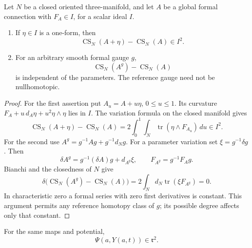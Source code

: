 \begin{lemma}
\label{conn:closed-comparisons}
Let \(N\) be a closed oriented three-manifold, and let \(A\)
be a global formal connection with \(F_A\in I\), for a
scalar ideal \(I\).
\begin{enumerate}
\item If \(\eta\in I\) is a one-form, then
\[
 \operatorname{CS}_N(A+\eta)-\operatorname{CS}_N(A)\in I^2.
\]
\item For an arbitrary smooth formal gauge \(g\),
\[
 \operatorname{CS}_N(A^g)-\operatorname{CS}_N(A)
\]
is independent of the parameters.  The reference gauge
need not be nullhomotopic.
\end{enumerate}
\end{lemma}

\begin{proof}
For the first assertion put \(A_u=A+u\eta\),
\(0\leq u\leq1\).  Its curvature
\(F_A+u\,d_A\eta+u^2\eta\wedge\eta\) lies in \(I\).
The variation formula on the closed manifold gives
\[
 \operatorname{CS}_N(A+\eta)-\operatorname{CS}_N(A)
     =2\int_0^1\int_N\operatorname{tr}(\eta\wedge F_{A_u})\,du
                                                        \in I^2.
\]
For the second use
\(A^g=g^{-1}Ag+g^{-1}d_Ng\).
For a parameter variation set \(\xi=g^{-1}\delta g\).
Then
\[
 \delta A^g=g^{-1}(\delta A)g+d_{A^g}\xi,\qquad
 F_{A^g}=g^{-1}F_Ag.
\]
Bianchi and the closedness of \(N\) give
\[
 \delta\bigl(\operatorname{CS}_N(A^g)
                         -\operatorname{CS}_N(A)\bigr)
     =2\int_N d_N\operatorname{tr}(\xi F_{A^g})=0.
\]
In characteristic zero a formal series with zero first
derivatives is constant.  This argument permits any
reference homotopy class of \(g\); its possible degree
affects only that constant.
\end{proof}

\begin{proposition}
\label{conn:value-ideal}
For the same maps and potential,
\begin{equation}
 \Psi(a,Y(a,t))\in\mathfrak r^2 .
 \label{conn:value-identity}
\end{equation}
\end{proposition}

